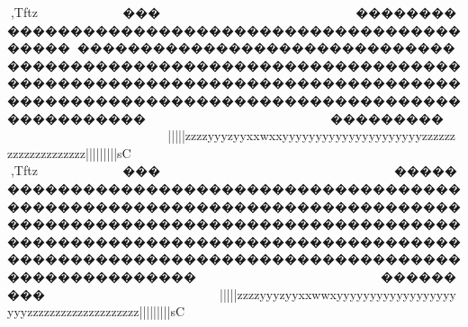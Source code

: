 {{{{{{{{{{{{{{{{{{{{{{{{{{{{{{{{{{{{{{{{{{{{{{{{{{{{{{{{{{{{{{{{{{{{{{{{{{{{{{{{{{{{{{{{{{{{{{{{{{{{{{{{{{{{{{{{{{{{{{{{{{{{{{{{{{{{{{{{{{{{{{{{{{{{{{{{{{{{{{{{{{{{{{{{{{{{{{{{{{{{{{{{{{{{{{{{{{{{{{{{{{{{{{{{{{{{{{{{{{{{{{{{{{{{{{{{{{{{{{{{{{{{{{{{{{{{{{{{{{{{{{{{{{{{{{{{{{{{{{{{{{{{{{{{{{{{{{{{{{{{{{{{{{{{{{{{{{{{{{{{{{{{{{{{{{{{{{{{{{{{{{{{{{{{{{{{{{{{{{{{{{{{{{{{{{{{{{{{{{{{{{{{{{{{{{{{{{{{{{{{{{{{{{{{{{{{{{{{{{{{{{{{{{{{{{{{{{{{{{{{{{{{{{{{{{{{{{{{{{{{{{{{{{{{{{{{{{{{{{{{{{{{{{{{{{{{{{{{{{{{{{{{{{{{{{{{{{{{{{{{{{{{{{{{{{{{{{{{{{{{{{{{{{{{{{{{{{{{{{{{{{{{{{{{{{{{{{{{{{{{{{{{{{{{{{{{{{{{{{{{{{{{{{{{{{{{{{{{{{{{{{{{{{{{{{{{{{{{{{{{{{{{{{{{{{{{{{{{{{{{{{{{{{{{{{{{{{{{{{{{{{{{{{{{{{{{{{{{{{{{{{{{{{{{{{{{{{{{{{{{{{{{{{{{{{{{{{{{{{{{{{{{{{{{{{{{{{{{{{{{{{{{{{{{{{{{{{{{{{{{{{{{{{{{{{{{{{{{{{{{{{{{{{{{{{{{{{{{{{{{{{{{{{{{{{{{{{{{{{{{{{{{{{{{{{{{{{{{{{{{{{{{{{{{{{{{{{{{{{{{{{{{{{{{{{{{{{{{{{{{{{{{{{{{{{{{{{{{{{{{{{{{{{{{{{{{{{{{{{{{{{{{{{{{{{{{{{{{{{{{{{{{{{{{{{{{{{{{{{{{{{{{{{{{{{{{{{{{{{{{{{{{{{{{{{{{{{{{{{{{{{{{{{{{{{{{{{{{{{{{{{{{{{{{{{{{{{{{{{{{{{{{{{{{{{{{{{{{{{{{{{{{{{{{{{{{{{{{{{{{{{{{{{{{{{{{{{{{{{{{{{{{{{{{{{{{{{{{{{{{{{{{{{{{{{{{{{{,Tftz~~~~~~~~~���~~~~~~~~~}}}}}}}~~~~~~~~������������������������������������������������������������������������������������������������������������������������������������������������������������������������������������������������������~~~~~~~~���������~~~~~~~~~~~~~~~~~~~~~}}}}}}{{{{{|||||{{{{{{{{{{{{zzzzyyyzyyxxwxxyyyyyyyyyyyyyyyyyyyyyzzzzzzzzzzzzzzzzzzzz{{{{{{{{{{{{|||||||||sC
,Tftz~~~~~~~~~���~~~~~~~~~~~~~~~~~~~~~~��������������������������������������������������������������������������������������������������������������������������������������������������������������������������������������������������������~~~~~~~~���������~~~~~~~~~~~~~~~~~~~~~}}}}}}{{{{{|||||{{{{{{{{{{{{zzzzyyyzyyxxwwxyyyyyyyyyyyyyyyyyyyyyzzzzzzzzzzzzzzzzzzzz{{{{{{{{{{{{|||||||||sC
}}}}}}}}}}}}}}}}}}}}}}}}}}}}}}}}}}}}}}}}}}}}}}}}}}}}}}}}}}}}}}}}}}}}}}}}}}}}}}}}}}}}}}}}}}}}}}}}}}}}}}}}}}}}}}}}}}}}}}}}}}}}}}}}}}}}}}}}}}}}}}}}}}}}}}}}}}}}}}}}}}}}}}}}}}}}}}}}}}}}}}}}}}}}}}}}}}}}}}}}}}}}}}}}}}}}}}}}}}}}}}}}}}}}}}}}}}}}}}}}}}}}}}}}}}}}}}}}}}}}}}}}}}}}}}}}}}}}}}}}}}}}}}}}}}}}}}}}}}}}}}}}}}}}}}}}}}}}}}}}}}}}}}}}}}}}}}}}}}}}}}}}}}}}}}}}}}}}}}}}}}}}}}}}}}}}}}}}}}}}}}}}}}}}}}}}}}}}}}}}}}}}}}}}}}}}}}}}}}}}}}}}}}}}}}}}}}}}}}}}}}}}}}}}}}}}}}}}}}}}}}}}}}}}}}}}}}}}}}}}}}}}}}}}}}}}}}}}}}}}}}}}}}}}}}}}}}}}}}}}}}}}}}}}}}}}}}}}}}}}}}}}}}}}}}}}}}}}}}}}}}}}}}}}}}}}}}}}}}}}}}}}}}}}}}}}}}}}}}}}}}}}}}}}}}}}}}}}}}}}}}}}}}}}}}}}}}}}}}}}}}}}}}}}}}}}}}}}}}}}}}}}}}}}}}}}}}}}}}}}}}}}}}}}}}}}}}}}}}}}}}}}}}}}}}}}}}}}}}}}}}}}}}}}}}}}}}}}}}}}}}}}}}}}}}}}}}}}}}}}}}}}}}}}}}}}}}}}}}}}}}}}}}}}}}}}}}}}}}}}}}}}}}}}}}}}}}}}}}}}}}}}}}}}}}}}}}}}}}}}}}}}}}}}}}}}}}}}}}}}}}}}}}}}}}}}}}}}}}}}}}}}}}}}}}}}}}}}}}}}}}}}}}}}}}}}}}}}}}}}}}}}}}}}}}}}}}}}}}}}}}}}}}}}}}}}}}}}}}}}}}}}}}}}}}}}}}}}}}}}}}}}}}}}}}}}}}}}}}}}}}}}}}}}}}}}}}}}}}}}}}}}}}}}}}}}}}}}}}}}}}}}}}}}}}}}}}}}}}}}}}}}}}}}}}}}}}}}}}}}}}}}}}}}}}}}}}}}}}}}}}}}}}}}}}}}}}}}}}}}}}}}}}}}}}}}}}}}}}}}}}}}}}}}}}}}}}}}}}}}}}}}}}}}}}}}}}}}}}}}}}}}}}}}}}}}}}
